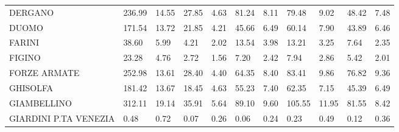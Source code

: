 \begin{table}[H]
{{\begin{tabular}{lp{1.3cm}p{1.3cm}p{1.3cm}p{1.3cm}p{1.3cm}p{1.3cm}p{1.3cm}p{1.3cm}p{1.3cm}p{1.3cm}}
DERGANO                                            &                    236.99 &                 14.55 &                       27.85 &                    4.63 &                       81.24 &                    8.11 &                       79.48 &                    9.02 &                     48.42 &                  7.48 \\
DUOMO                                              &                    171.54 &                 13.72 &                       21.85 &                    4.21 &                       45.66 &                    6.49 &                       60.14 &                    7.90 &                     43.89 &                  6.46 \\
FARINI                                             &                     38.60 &                  5.99 &                        4.21 &                    2.02 &                       13.54 &                    3.98 &                       13.21 &                    3.25 &                      7.64 &                  2.35 \\
FIGINO                                             &                     23.28 &                  4.76 &                        2.72 &                    1.56 &                        7.20 &                    2.42 &                        7.94 &                    2.86 &                      5.42 &                  2.01 \\
FORZE ARMATE                                       &                    252.98 &                 13.61 &                       28.40 &                    4.40 &                       64.35 &                    8.40 &                       83.41 &                    9.86 &                     76.82 &                  9.36 \\
GHISOLFA                                           &                    181.42 &                 13.67 &                       18.45 &                    4.63 &                       55.23 &                    7.40 &                       62.35 &                    7.15 &                     45.39 &                  6.49 \\
GIAMBELLINO                                        &                    312.11 &                 19.14 &                       35.91 &                    5.64 &                       89.10 &                    9.60 &                      105.55 &                   11.95 &                     81.55 &                  8.42 \\
GIARDINI P.TA VENEZIA                              &                      0.48 &                  0.72 &                        0.07 &                    0.26 &                        0.06 &                    0.24 &                        0.23 &                    0.49 &                      0.12 &                  0.36 \\

\end{tabular}}}
\end{table}

